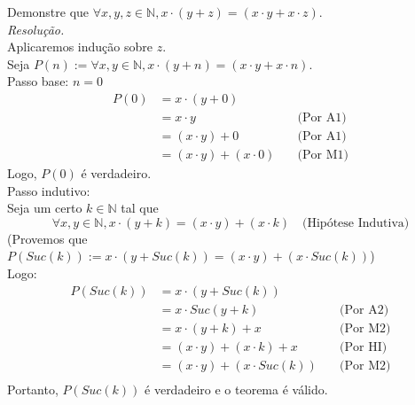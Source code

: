 Demonstre que $\forall x,y, z \in \mathbb{N}, x \cdot (y + z) = (x \cdot y + x \cdot z)$. \\
\emph{Resolução.}\\
Aplicaremos indução sobre $z$. \\
Seja $P(n) := \forall x, y \in \mathbb{N}, x \cdot (y + n) = (x \cdot y + x \cdot n)$. \\
Passo base: $n = 0$
\begin{align*}
	P(0) & = x \cdot (y + 0)                                   \\
	     & = x \cdot y                 & \quad \text{(Por A1)} \\
	     & = (x \cdot y) + 0           & \quad \text{(Por A1)} \\
	     & = (x \cdot y) + (x \cdot 0) & \quad \text{(Por M1)}
\end{align*}
Logo, $P(0)$ é verdadeiro. \\
Passo indutivo: \\
Seja um certo $k \in \mathbb{N}$ tal que
\begin{displaymath}
	\forall x,y \in \mathbb{N}, x \cdot (y + k) = (x \cdot y) + (x \cdot k) \quad \text{(Hipótese Indutiva)}
\end{displaymath}
(Provemos que $P(Suc(k)):= x \cdot (y + Suc(k)) = (x \cdot y) + (x \cdot Suc(k))$) \\
Logo:
\begin{align*}
	P(Suc(k)) & = x \cdot (y + Suc(k))                                   \\
	          & = x \cdot Suc(y + k)             & \quad \text{(Por A2)} \\
	          & = x \cdot (y + k) + x            & \quad \text{(Por M2)} \\
	          & = (x \cdot y) + (x \cdot k) + x  & \quad \text{(Por HI)} \\
	          & = (x \cdot y) + (x \cdot Suc(k)) & \quad \text{(Por M2)} \\
\end{align*}
Portanto, $P(Suc(k))$ é verdadeiro e o teorema é válido.